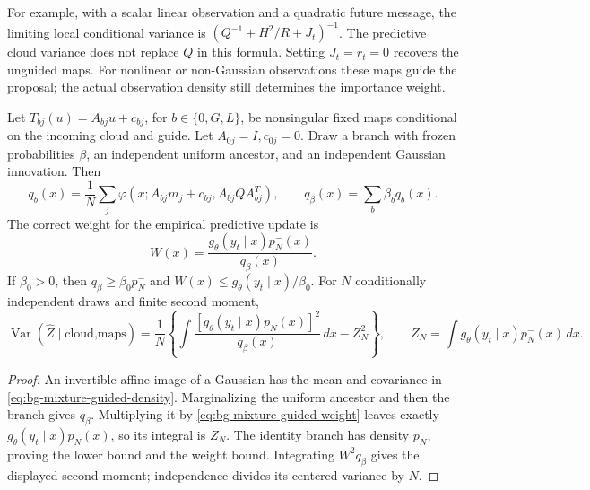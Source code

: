 For example, with a scalar linear observation and a quadratic future
message, the limiting local conditional variance is
$(Q^{-1}+H^2/R+J_t)^{-1}$. The predictive cloud variance does not replace
$Q$ in this formula. Setting $J_t=r_t=0$ recovers the unguided maps.
For nonlinear or non-Gaussian observations these maps guide the proposal;
the actual observation density still determines the importance weight.

\begin{proposition}
\label{prop:bg-mixture-guided-weights}
Let $T_{bj}(u)=A_{bj}u+c_{bj}$, for $b\in\{0,G,L\}$, be nonsingular fixed
maps conditional on the incoming cloud and guide. Let $A_{0j}=I,c_{0j}=0$.
Draw a branch with frozen probabilities $\beta$, an independent uniform
ancestor, and an independent Gaussian innovation. Then
\begin{equation}
 q_b(x)=\frac1N\sum_j\varphi(x;A_{bj}m_j+c_{bj},A_{bj}QA_{bj}^T),
 \qquad q_\beta(x)=\sum_b\beta_bq_b(x).
 \label{eq:bg-mixture-guided-density}
\end{equation}
The correct weight for the empirical predictive update is
\begin{equation}
 W(x)=\frac{g_\theta(y_t\mid x)p_N^-(x)}{q_\beta(x)}.
 \label{eq:bg-mixture-guided-weight}
\end{equation}
If $\beta_0>0$, then $q_\beta\geq\beta_0p_N^-$ and
$W(x)\leq g_\theta(y_t\mid x)/\beta_0$. For $N$ conditionally independent
draws and finite second moment,
\begin{equation}
 \operatorname{Var}(\widehat Z\mid\text{cloud,maps})
 =\frac1N\left\{\int\frac{[g_\theta(y_t\mid x)p_N^-(x)]^2}
 {q_\beta(x)}\,dx-Z_N^2\right\},\qquad
 Z_N=\int g_\theta(y_t\mid x)p_N^-(x)\,dx.
 \label{eq:bg-mixture-guided-variance}
\end{equation}
\end{proposition}
\begin{proof}
An invertible affine image of a Gaussian has the mean and covariance in
\eqref{eq:bg-mixture-guided-density}. Marginalizing the uniform ancestor and
then the branch gives $q_\beta$. Multiplying it by
\eqref{eq:bg-mixture-guided-weight} leaves exactly
$g_\theta(y_t\mid x)p_N^-(x)$, so its integral is $Z_N$.
The identity branch has density $p_N^-$, proving the lower bound and the
weight bound. Integrating $W^2q_\beta$ gives the displayed second moment;
independence divides its centered variance by $N$.
\end{proof}

